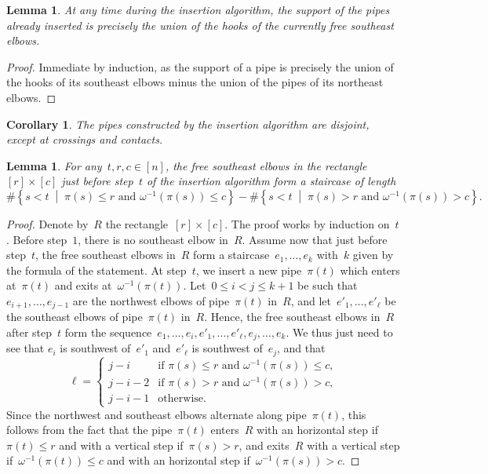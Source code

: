 \documentclass[reqno]{amsart}
\newtheorem{corollary}[theorem]{Corollary}
\newtheorem{lemma}[theorem]{Lemma}
\theoremstyle{definition}
\newcommand{\set}[2]{\left\{ #1 \;\middle|\; #2 \right\}} %
\begin{document}
\begin{lemma}
\label{lem:disjointPipesInsertionAlgorithm}
At any time during the insertion algorithm, the support of the pipes already inserted is precisely the union of the hooks of the currently free southeast elbows.
\end{lemma}

\begin{proof}
Immediate by induction, as the support of a pipe is precisely the union of the hooks of its southeast elbows minus the union of the pipes of its northeast elbows.
\end{proof}

\begin{corollary}
\label{coro:disjointPipesInsertionAlgorithm}
The pipes constructed by the insertion algorithm are disjoint, except at crossings and contacts.
\end{corollary}

\begin{lemma}
\label{lem:rectangleInsertionAlgorithm}
For any~$t, r, c \in [n]$, the free southeast elbows in the rectangle~$[r] \times [c]$ just before step~$t$ of the insertion algorithm form a staircase of length
\[
\# \set{s < t}{\pi(s) \le r \text{ and } \omega^{-1}(\pi(s)) \le c} - \# \set{s < t}{\pi(s) > r \text{ and } \omega^{-1}(\pi(s)) > c}.
\]
\end{lemma}

\begin{proof}
Denote by~$R$ the rectangle~$[r] \times [c]$.
The proof works by induction on~$t$.
Before step~$1$, there is no southeast elbow in~$R$.
Assume now that just before step~$t$, the free southeast elbows in~$R$ form a staircase~$e_1, \dots, e_k$ with~$k$ given by the formula of the statement.
At step~$t$, we insert a new pipe~$\pi(t)$ which enters at~$\pi(t)$ and exits at~$\omega^{-1}(\pi(t))$.
Let~${0 \le i < j \le k+1}$ be such that~$e_{i+1}, \dots, e_{j-1}$ are the northwest elbows of pipe~$\pi(t)$ in~$R$, and let~$e'_1, \dots, e'_\ell$ be the southeast elbows of pipe~$\pi(t)$ in~$R$.
Hence, the free southeast elbows in~$R$ after step~$t$ form the sequence~$e_1, \dots, e_i, e'_1, \dots, e'_\ell, e_j, \dots, e_k$.
We thus just need to see that $e_i$ is southwest of~$e'_1$ and~$e'_\ell$ is southwest of~$e_j$, and that
\[
\ell = \begin{cases} j-i  & \text{if } \pi(s) \le r \text{ and } \omega^{-1}(\pi(s)) \le c, \\  j-i-2  & \text{if } \pi(s) > r \text{ and } \omega^{-1}(\pi(s)) > c, \\  j-i-1 & \text{otherwise.} \end{cases}
\]
Since the northwest and southeast elbows alternate along pipe~$\pi(t)$, this follows from the fact that the pipe~$\pi(t)$ enters~$R$ with an horizontal step if~$\pi(t) \le r$ and with a vertical step if~$\pi(s) > r$, and exits~$R$ with a vertical step if~$\omega^{-1}(\pi(t)) \le c$ and with an horizontal step if~$\omega^{-1}(\pi(s)) > c$.
\end{proof}
\end{document}
